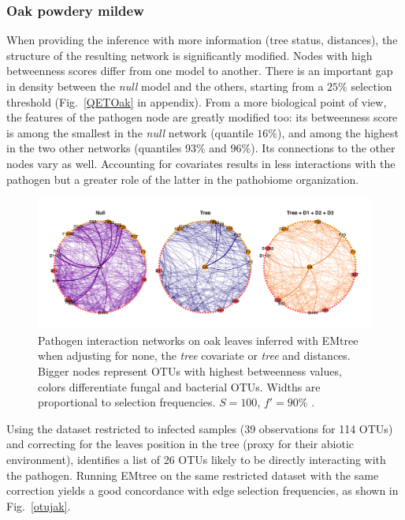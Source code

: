 \subsubsection{Oak powdery mildew}  
\label{oak}

When providing the inference with more information (tree status, distances), the structure of the resulting network is significantly modified. Nodes with high betweenness scores differ from one model to another. There is an important gap in density between the \textit{null} model and the others, starting from a $25\%$ selection threshold (Fig.~\ref{QETOak} in appendix). From a more biological point of view, the features of the pathogen node are greatly modified too: its betweenness score is among the smallest in the \textit{null} network (quantile $16\%$), and among the highest in the two other networks (quantiles $93\%$ and $96\%$). Its connections to the other nodes vary as well. 
Accounting for covariates results in less interactions with the pathogen but a greater role of the latter in the pathobiome organization.


 \begin{figure}[H]
    \centering
    \includegraphics[width=\linewidth]{figs/OakProbNets.png}
    \caption{Pathogen interaction networks on oak leaves inferred with EMtree when adjusting for none, the \textit{tree} covariate or \textit{tree} and distances. Bigger nodes represent OTUs with highest betweenness values, colors differentiate fungal and bacterial OTUs. Widths are proportional to selection frequencies. $S=100$, $f'=90\%$ .  }
    \label{oakNets}
\end{figure}

Using the dataset restricted to infected samples (39 observations for 114 OTUs) and correcting for the leaves position in the tree (proxy for their abiotic environment), \citet{jakuch} identifies a list of 26 OTUs likely to be directly interacting with the pathogen. Running EMtree on the same restricted dataset with the same correction yields a good concordance with  edge selection frequencies, as shown in Fig.~\ref{otujak}.


